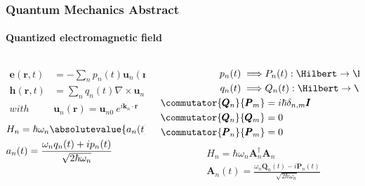\begin{frame}
    \frametitle{Quantum Mechanics Abstract}
    \framesubtitle{Quantized electromagnetic field}
    
    \begin{columns}
        \begin{column}{0.5\textwidth}
            \begin{equation*}\begin{split}
                \pmb{e}(\pmb{r},t)&=-\sum_n p_n (t)\pmb{u}_n (\pmb{r})\\
                \pmb{h}(\pmb{r},t)&=\sum_n q_n (t)\nabla\times\pmb{u}_n (\pmb{r})\\
                with\ &\pmb{u}_n (\pmb{r})=\pmb{u}_{n0}\ e^{i\pmb{k}_n \cdot \pmb{r}}
            \end{split}\end{equation*}
            \vspace{2.5mm}
            \begin{equation*}\begin{split}
                &H_n=\hbar\omega_n\absolutevalue{a_n(t)}^2\\
                &a_n(t)=\frac{\omega_nq_n(t)+ip_n(t)}{\sqrt{2\hbar\omega_n}}
            \end{split}\end{equation*}
        \end{column}
        \begin{column}{0.5\textwidth}
            \begin{equation*}\begin{split}
                p_n (t) \implies& P_n(t):\Hilbert\rightarrow\Hilbert\\
                q_n (t) \implies& Q_n(t):\Hilbert\rightarrow\Hilbert\\
                \commutator{\pmb{Q}_n}{\pmb{P}_m}&=i\hbar\delta_{n,m}\pmb{I}\\ 
                \commutator{\pmb{Q}_n}{\pmb{Q}_m}&=0\\
                \commutator{\pmb{P}_n}{\pmb{P}_m}&=0
            \end{split}\end{equation*}
            \begin{equation*}\begin{split}
                &H_n=\hbar\omega_n\pmb{A}_n^\dagger\pmb{A}_n\\
                &\pmb{A}_n(t)=\frac{\omega_n\pmb{Q}_n(t)-i\pmb{P}_n(t)}{\sqrt{2\hbar\omega_n}}
            \end{split}\end{equation*}
        \end{column}
    \end{columns}
    \mbox{}\\
    \mbox{}\\
    \mbox{}\\
    \mbox{}\\
\end{frame}